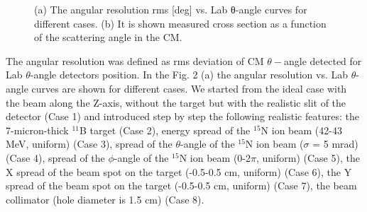 \documentclass[%
 aip,
cp,  %
 amsmath,amssymb,%
 reprint,%
]{revtex4-2}
\begin{document}
\begin{figure}[h!]
\begin{minipage}[h]{0.49\linewidth}
\end{minipage}
\hfill
\begin{minipage}[h]{0.48\linewidth}
\end{minipage}
\vspace{0.05cm}
\caption{(a) The angular resolution rms [deg] vs. Lab θ-angle curves for different cases. (b)  It is shown measured cross section as a function of the scattering angle in the CM. }
\label{ris:fig1}
\end{figure}

The angular resolution was defined as rms deviation of CM $\theta-$angle detected for Lab $\theta$-angle detectors position.
In the Fig. 2 (a) the angular resolution vs. Lab $\theta$-angle curves are shown for different cases. We started from the ideal case with the beam along the Z-axis, without the target but with the realistic slit of the detector (Case 1) and introduced step by step the following realistic features: the 7-micron-thick ${}^{11}$B target (Case 2), energy spread of the ${}^{15}$N ion beam (42-43 MeV, uniform) (Case 3), spread of the $\theta$-angle of the ${}^{15}$N ion beam ($\sigma$ = 5 mrad) (Case 4),  spread of the $\phi$-angle of the ${}^{15}$N ion beam (0-2$\pi$, uniform) (Case 5), the X spread of the beam spot on the target (-0.5-0.5 cm, uniform) (Case 6), the Y spread of the beam spot on the target (-0.5-0.5 cm, uniform) (Case 7), the beam collimator (hole diameter is 1.5 cm)  (Case 8).
\end{document}
